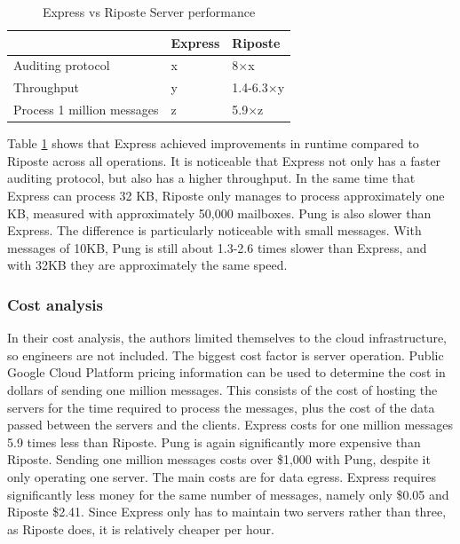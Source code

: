 \documentclass[a4paper]{article}
\begin{document}
\begin{table}[h!]
\centering
\caption{Express vs Riposte Server performance}
\label{tab:riposte}
\begin{tabular}{lll}
\hline
                           & Express & Riposte   \\ \hline
Auditing protocol          & x       & 8$\times$x       \\ \hline
Throughput                 & y       & 1.4-6.3$\times$y \\ \hline
Process 1 million messages & z       & 5.9$\times$z     \\ \hline
\end{tabular}
\end{table}
Table \ref{tab:riposte} shows that Express achieved improvements in runtime compared to Riposte across all operations. It is noticeable that Express not only has a faster auditing protocol, but also has a higher throughput. In the same time that Express can process 32 KB, Riposte only manages to process approximately one KB, measured with approximately 50,000 mailboxes. Pung is also slower than Express. The difference is particularly noticeable with small messages. With messages of 10KB, Pung is still about 1.3-2.6 times slower than Express, and with 32KB they are approximately the same speed. 
\subsubsection{Cost analysis} In their cost analysis, the authors limited themselves to the cloud infrastructure, so engineers are not included. The biggest cost factor is server operation. Public Google Cloud Platform pricing information can be used to determine the cost in dollars of sending one million messages. This consists of the cost of hosting the servers for the time required to process the messages, plus the cost of the data passed between the servers and the clients. Express costs for one million messages 5.9 times less than Riposte. Pung is again significantly more expensive than Riposte. Sending one million messages costs over \$1,000 with Pung, despite it only operating one server. The main costs are for data egress. Express requires significantly less money for the same number of messages, namely only \$0.05 and Riposte \$2.41.  Since Express only has to maintain two servers rather than three, as Riposte does, it is relatively cheaper per hour.
\end{document}
